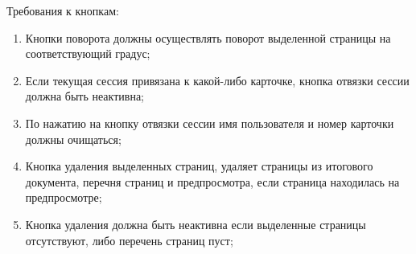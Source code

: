 \begin{enumerate}
\hspace*{2.5em} Требования к кнопкам:
\begin{enumerate}
	\item Кнопки поворота должны осуществлять поворот выделенной страницы на соответствующий градус;
	\item Если текущая сессия привязана к какой-либо карточке, кнопка отвязки сессии должна быть неактивна;
	\item По нажатию на кнопку отвязки сессии имя пользователя и номер карточки должны очищаться;
	\item Кнопка удаления выделенных страниц, удаляет страницы из итогового документа, перечня страниц и предпросмотра, если страница находилась на предпросмотре;
	\item Кнопка удаления должна быть неактивна если выделенные страницы отсутствуют, либо перечень страниц пуст;
	\
\end{enumerate}




\end{enumerate}